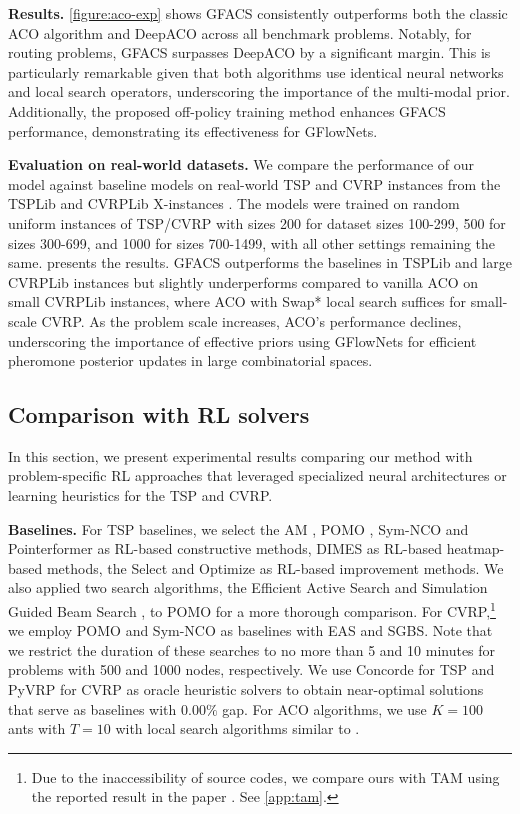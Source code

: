 \documentclass[twoside]{article}
\theoremstyle{plain}
\theoremstyle{definition}
\theoremstyle{remark}
\begin{document}
\textbf{Results.} 
\cref{figure:aco-exp} shows GFACS consistently outperforms both the classic ACO algorithm and DeepACO across all benchmark problems. Notably, for routing problems, GFACS surpasses DeepACO by a significant margin. This is particularly remarkable given that both algorithms use identical neural networks and local search operators, underscoring the importance of the multi-modal prior. Additionally, the proposed off-policy training method enhances GFACS performance, demonstrating its effectiveness for GFlowNets.


\textbf{Evaluation on real-world datasets.} 
We compare the performance of our model against baseline models on real-world TSP and CVRP instances from the TSPLib \citep{reinelt1991tsplib} and CVRPLib X-instances \citep{uchoa2017new}. The models were trained on random uniform instances of TSP/CVRP with sizes 200 for dataset sizes 100-299, 500 for sizes 300-699, and 1000 for sizes 700-1499, with all other settings remaining the same.  presents the results. GFACS outperforms the baselines in TSPLib and large CVRPLib instances but slightly underperforms compared to vanilla ACO on small CVRPLib instances, where ACO with Swap* local search suffices for small-scale CVRP. As the problem scale increases, ACO's performance declines, underscoring the importance of effective priors using GFlowNets for efficient pheromone posterior updates in large combinatorial spaces.


\subsection{Comparison with RL solvers}
\label{sec:exp-vs-nco}



In this section, we present experimental results comparing our method with problem-specific RL approaches that leveraged specialized neural architectures or learning heuristics for the TSP and CVRP.

\textbf{Baselines.} For TSP baselines, we select the AM \citep{kool2018attention}, POMO \citep{kwon2020pomo}, Sym-NCO \citep{kim2022sym} and Pointerformer \citep{jin2023pointerformer} as RL-based constructive methods, DIMES \citep{qiu2022dimes} as RL-based heatmap-based methods, the Select and Optimize \citep[SO; ][]{cheng2023select} as RL-based improvement methods. We also applied two search algorithms, the Efficient Active Search \citep[EAS; ][]{hottung2021efficient} and Simulation Guided Beam Search \citep[SGBS; ][]{choo2022simulation}, to POMO for a more thorough comparison. For CVRP,\footnote{Due to the inaccessibility of source codes, we compare ours with TAM using the reported result in the paper \citep{hou2022generalize}. See \cref{app:tam}.} we employ POMO and Sym-NCO as baselines with EAS and SGBS. Note that we restrict the duration of these searches to no more than 5 and 10 minutes for problems with 500 and 1000 nodes, respectively. We use Concorde \citep{concorde} for TSP and PyVRP \citep{Wouda_Lan_Kool_PyVRP_2024} for CVRP as oracle heuristic solvers to obtain near-optimal solutions that serve as baselines with $0.00\%$ gap. For ACO algorithms, we use $K = 100$ ants with $T = 10$ with local search algorithms similar to \citet{ye2023deepaco}.
\end{document}
